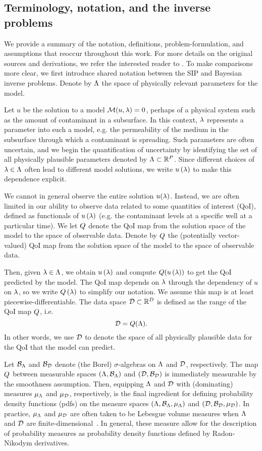 \subsection{Terminology, notation, and the inverse problems}
We provide a summary of the notation, definitions, problem-formulation, and assumptions that reoccur throughout this work.
For more details on the original sources and derivations,  we refer the interested reader to \cite{BES12, BE13, BET+14}.
To make comparisons more clear, we first introduce shared notation between the SIP and Bayesian inverse problems.
Denote by ${\Lambda}$ the space of physically relevant parameters for the model.

Let $u$ be the solution to a model $\mathcal{M}(u, \lambda) = 0$, perhaps of a physical system such as the amount of contaminant in a subsurface.
In this context, $\lambda$ represents a parameter into such a model, e.g. the permeability of the medium in the subsurface through which a contaminant is spreading.
Such parameters are often uncertain, and we begin the quantification of uncertainty by identifying the set of all physically plausible parameters denoted by ${\Lambda}\subset\mathbb{R}^P$.
Since different choices of $\lambda \in {\Lambda}$ often lead to different model solutions, we write $u\left ( \lambda \right )$ to make this dependence explicit.

We cannot in general observe the entire solution $u(\lambda)$.
Instead, we are often limited in our ability to observe data related to some quantities of interest (QoI), defined as functionals of $u\left ( \lambda \right )$ (e.g. the contaminant levels at a specific well at a particular time).
We let $Q$ denote the QoI map from the solution space of the model to the space of observable data.
Denote by $Q$ the (potentially vector-valued) QoI map from the solution space of the model to the space of observable data.

Then, given $\lambda \in {\Lambda}$, we obtain $u\left ( \lambda \right )$ and compute $Q(u\left ( \lambda \right ))$ to get the QoI predicted by the model.
The QoI map depends on $\lambda$ through the dependency of $u$ on $\lambda$, so we write $Q\left ( \lambda \right )$ to simplify our notation.
We assume this map is at least piecewise-differentiable.
The data space $\mathcal{D} \subset \mathbb{R}^D$ is defined as the range of the QoI map $Q$, i.e.
\[
\mathcal{D} = Q({\Lambda}).
\]
In other words, we use $\mathcal{D}$ to denote the space of all physically plausible data for the QoI that the model can predict.


Let $\mathcal{B}_{{\Lambda}}$ and $\mathcal{B}_{\mathcal{D}}$ denote (the Borel) $\sigma$-algebras on ${\Lambda}$ and $\mathcal{D}$, respectively.
The map $Q$ between measurable spaces $({\Lambda}, \mathcal{B}_{{\Lambda}})$ and $(\mathcal{D}, \mathcal{B}_{\mathcal{D}})$ is immediately measurable by the smoothness assumption.
Then, equipping ${\Lambda}$ and $\mathcal{D}$ with (dominating) measures $\mu_{{\Lambda}}$ and $\mu_{\mathcal{D}}$, respectively, is the final ingredient for defining probability density functions (pdfs) on the measure spaces $({\Lambda}, \mathcal{B}_{{\Lambda}}, \mu_{{\Lambda}})$ and $(\mathcal{D}, \mathcal{B}_{\mathcal{D}}, \mu_{\mathcal{D}})$.
In practice, $\mu_{{\Lambda}}$ and $\mu_{\mathcal{D}}$ are often taken to be Lebesgue volume measures when ${\Lambda}$ and $\mathcal{D}$ are finite-dimensional~\cite{BET+14, BJW18}.
In general, these measure allow for the description of probability measures as probability density functions defined by Radon-Nikodym derivatives.


